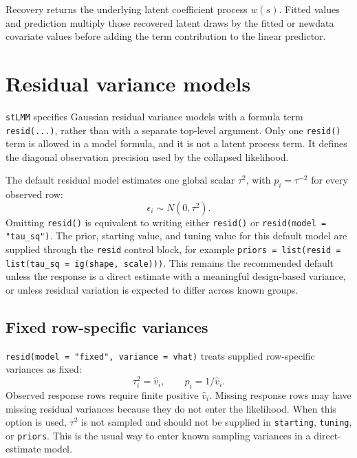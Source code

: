 \documentclass[11pt]{article}
\begin{document}
Recovery returns the underlying latent coefficient process $w(s)$. Fitted values and prediction multiply those recovered latent draws by the fitted or newdata covariate values before adding the term contribution to the linear predictor.

\section{Residual variance models}\label{residual-models}

\texttt{stLMM} specifies Gaussian residual variance models with a formula term \texttt{resid(...)}, rather than with a separate top-level argument. Only one \texttt{resid()} term is allowed in a model formula, and it is not a latent process term. It defines the diagonal observation precision used by the collapsed likelihood.

The default residual model estimates one global scalar $\tau^2$, with $p_i=\tau^{-2}$ for every observed row:
\begin{equation}
  \epsilon_i \sim N(0,\tau^2).
\end{equation}
Omitting \texttt{resid()} is equivalent to writing either \texttt{resid()} or \texttt{resid(model = "tau\_sq")}. The prior, starting value, and tuning value for this default model are supplied through the \texttt{resid} control block, for example \texttt{priors = list(resid = list(tau\_sq = ig(shape, scale)))}. This remains the recommended default unless the response is a direct estimate with a meaningful design-based variance, or unless residual variation is expected to differ across known groups.

\subsection{Fixed row-specific variances}

\texttt{resid(model = "fixed", variance = vhat)} treats supplied row-specific variances as fixed:
\begin{equation}
  \tau_i^2 = \widehat v_i,\qquad p_i = 1/\widehat v_i.
\end{equation}
Observed response rows require finite positive $\widehat v_i$. Missing response rows may have missing residual variances because they do not enter the likelihood. When this option is used, $\tau^2$ is not sampled and should not be supplied in \texttt{starting}, \texttt{tuning}, or \texttt{priors}. This is the usual way to enter known sampling variances in a direct-estimate model.
\end{document}
